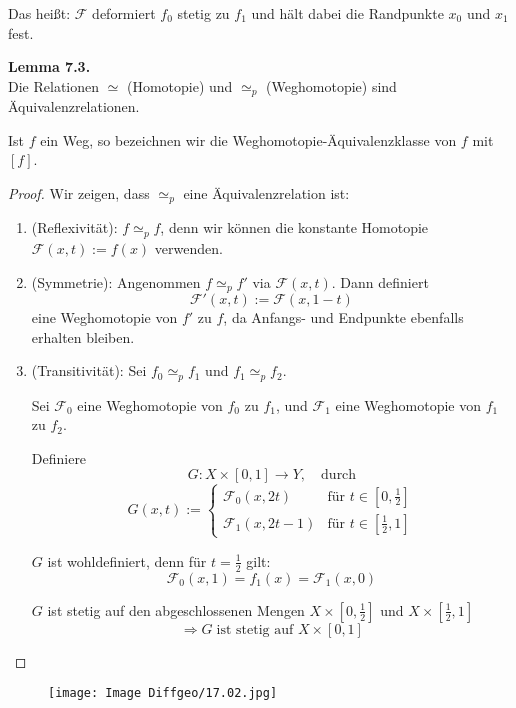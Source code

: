 \documentclass[fleqn, 12pt, letterpaper]{article}
\newcommand{\txt}[1]{\text{#1}}
\begin{document}
Das heißt: \( \mathcal{F} \) deformiert \( f_0 \) stetig zu \( f_1 \) und hält dabei die Randpunkte \( x_0 \) und \( x_1 \) fest.

\vspace{1em}

\textbf{Lemma 7.3.} \\
Die Relationen \( \simeq \) (Homotopie) und \( \simeq_p \) (Weghomotopie) sind Äquivalenzrelationen.

Ist \( f \) ein Weg, so bezeichnen wir die Weghomotopie-Äquivalenzklasse von \( f \) mit \( [f] \).

\begin{proof}
Wir zeigen, dass \( \simeq_p \) eine Äquivalenzrelation ist:

\begin{enumerate}
  \item {(Reflexivität):} \( f \simeq_p f \), denn wir können die konstante Homotopie \( \mathcal{F}(x,t) := f(x) \) verwenden.
  
  \item {(Symmetrie):} Angenommen \( f \simeq_p f' \) via \( \mathcal{F}(x,t) \). Dann definiert
  \[
  \mathcal{F}'(x,t) := \mathcal{F}(x,1 - t)
  \]
  eine Weghomotopie von \( f' \) zu \( f \), da Anfangs- und Endpunkte ebenfalls erhalten bleiben.
\end{enumerate}

\begin{enumerate}
  \setcounter{enumi}{2}
  \item (Transitivität): Sei \( f_0 \simeq_p f_1 \) und \( f_1 \simeq_p f_2 \). 

  Sei \( \mathcal{F}_0 \) eine Weghomotopie von \( f_0 \) zu \( f_1 \), und \( \mathcal{F}_1 \) eine Weghomotopie von \( f_1 \) zu \( f_2 \).

  Definiere
  \[
  G : X \times [0,1] \to Y, \quad \text{durch}
  \]
  \[
  G(x,t) := 
  \begin{cases}
    \mathcal{F}_0(x, 2t) & \text{für } t \in \left[0, \tfrac{1}{2} \right] \\
    \mathcal{F}_1(x, 2t - 1) & \text{für } t \in \left[\tfrac{1}{2}, 1 \right]
  \end{cases}
  \]

  \( G \) ist wohldefiniert, denn für \( t = \frac{1}{2} \) gilt:
  \[
  \mathcal{F}_0(x,1) = f_1(x) = \mathcal{F}_1(x,0)
  \]

  \( G \) ist stetig auf den abgeschlossenen Mengen \( X \times \left[0,\tfrac{1}{2}\right] \) und \( X \times \left[\tfrac{1}{2},1\right] \)
  \[\Rightarrow G \;\txt{ist stetig auf }X\times [0,1]\]
\end{enumerate}
\end{proof}
  \begin{figure}[H]
    \centering
    \texttt{[image: Image Diffgeo/17.02.jpg]}
 \end{figure}
\end{document}

